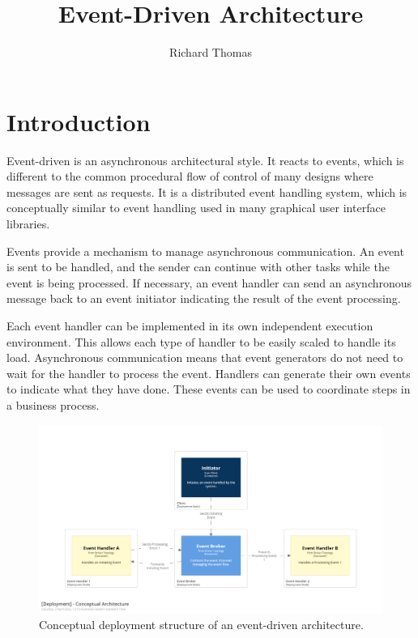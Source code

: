 \title{Event-Driven Architecture}
\author{Richard Thomas}

\maketitle

\section{Introduction}\label{sec:intro}

Event-driven is an asynchronous architectural style.
It reacts to events, which is different to the common procedural flow of control of many designs where messages are sent as requests.
It is a distributed event handling system, which is conceptually similar to event handling used in many graphical user interface libraries.

Events provide a mechanism to manage asynchronous communication.
An event is sent to be handled, and the sender can continue with other tasks while the event is being processed.
If necessary, an event handler can send an asynchronous message back to an event initiator indicating the result of the event processing.

Each event handler can be implemented in its own independent execution environment.
This allows each type of handler to be easily scaled to handle its load.
Asynchronous communication means that event generators do not need to wait for the handler to process the event.
Handlers can generate their own events to indicate what they have done.
These events can be used to coordinate steps in a business process.

\begin{figure}[h!]
    \begin{adjustwidth}{-10mm}{-10mm}
        \centering
        \includegraphics[trim=195 195 195 195,clip,width=0.95\paperwidth]{diagrams/conceptual-architecture.png}
    \end{adjustwidth}
    \caption{Conceptual deployment structure of an event-driven architecture.}
    \label{fig:conceptual-architecture}
\end{figure}

